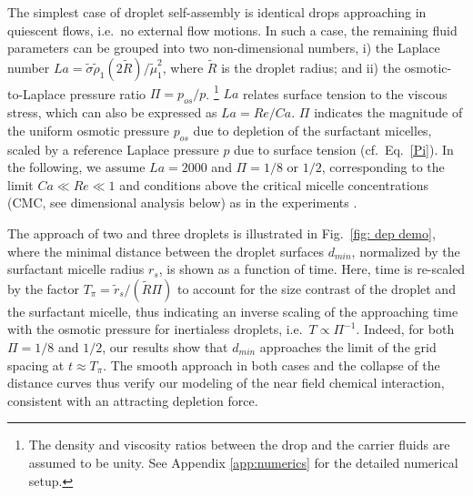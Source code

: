 The simplest case of droplet self-assembly is identical drops approaching in quiescent flows, i.e.\ no external flow motions. In such a case, the remaining fluid parameters can be grouped into two non-dimensional numbers, i) the Laplace number $La = \tilde{\sigma} \tilde{\rho}_1 (2\tilde{R})/\tilde{\mu}_1^2$, where $\tilde{R}$ is the droplet radius; and ii) the osmotic-to-Laplace pressure ratio $\Pi=p_{os}/p$. \footnote[3]{The density and viscosity ratios between the drop and the carrier fluids are assumed to be unity. See Appendix \ref{app:numerics} for the detailed numerical setup.} $La$ relates surface tension to the viscous stress, which can also be expressed as $La = Re/Ca$. $\Pi$ indicates the magnitude of the uniform osmotic pressure $p_{os}$ due to depletion of the surfactant micelles, scaled by a reference Laplace pressure $p$ due to surface tension (cf.\ Eq.\ \eqref{Pi}). In the following, we assume $La = 2000$ and $\Pi = 1/8$ or $1/2$, corresponding to the limit $Ca \ll Re \ll 1 $ and conditions above the critical micelle concentrations (CMC, see dimensional analysis below) as in the experiments \cite{Shen_2016AS}. 

The approach of two and three droplets is illustrated in Fig.\ \ref{fig: dep demo}, where the minimal distance between the droplet surfaces $d_{min}$, normalized by the surfactant micelle radius $r_s$, is shown as a function of time. Here, time is re-scaled by the factor $T_\pi = \tilde{r}_s/(\tilde{R}\Pi)$ to account for the size contrast of the droplet and the surfactant micelle, thus indicating an inverse scaling of the approaching time with the osmotic pressure for inertialess droplets, i.e.\ $T \propto \Pi^{-1}$. Indeed, for both $\Pi = 1/8$ and $1/2$, our results show that $d_{min}$ approaches the limit of the grid spacing at $t \approx T_\pi$. The smooth approach in both cases and the collapse of the distance curves thus verify our modeling of the near field chemical interaction, consistent with an attracting depletion force. 


